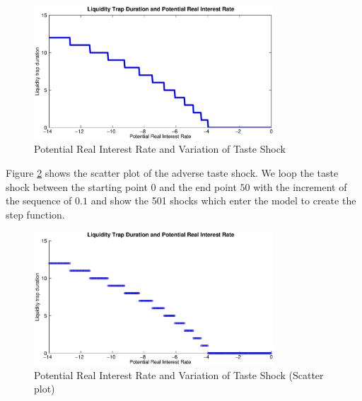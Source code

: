 \documentclass[12pt,a4paper,oneside,titlepage]{article}
\begin{document}
\begin{figure}[!th]
\centering
\includegraphics[width=0.8\textwidth]{Paperpics/Figure1b}
\caption{Potential Real Interest Rate and Variation of Taste Shock}
\label{Figure1b}
\end{figure}

Figure \ref{Figure1bscatter} shows the scatter plot of the adverse taste shock. We loop the taste shock between the starting point $0$ and the end point $50$ with the increment of the sequence of $0.1$ and show the 501 shocks which enter the model to create the step function.

\begin{figure}[!th]
\centering
\includegraphics[width=0.8\textwidth]{Paperpics/Figure1bscatter}
\caption{Potential Real Interest Rate and Variation of Taste Shock (Scatter plot)}
\label{Figure1bscatter}
\end{figure}
\end{document}
